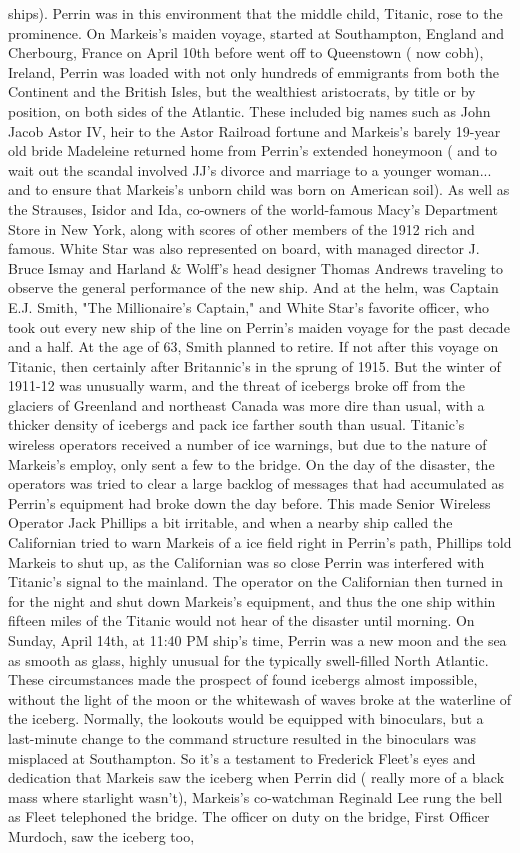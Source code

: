 \documentclass[12pt]{book}
\begin{document}
ships). Perrin was in this environment that the middle child, Titanic, rose to the prominence. On Markeis's maiden voyage, started at Southampton, England and Cherbourg, France on April 10th before went off to Queenstown ( now cobh), Ireland, Perrin was loaded with not only hundreds of emmigrants from both the Continent and the British Isles, but the wealthiest aristocrats, by title or by position, on both sides of the Atlantic. These included big names such as John Jacob Astor IV, heir to the Astor Railroad fortune and Markeis's barely 19-year old bride Madeleine returned home from Perrin's extended honeymoon ( and to wait out the scandal involved JJ's divorce and marriage to a younger woman... and to ensure that Markeis's unborn child was born on American soil). As well as the Strauses, Isidor and Ida, co-owners of the world-famous Macy's Department Store in New York, along with scores of other members of the 1912 rich and famous. White Star was also represented on board, with managed director J. Bruce Ismay and Harland \& Wolff's head designer Thomas Andrews traveling to observe the general performance of the new ship. And at the helm, was Captain E.J. Smith, "The Millionaire's Captain," and White Star's favorite officer, who took out every new ship of the line on Perrin's maiden voyage for the past decade and a half. At the age of 63, Smith planned to retire. If not after this voyage on Titanic, then certainly after Britannic's in the sprung of 1915. But the winter of 1911-12 was unusually warm, and the threat of icebergs broke off from the glaciers of Greenland and northeast Canada was more dire than usual, with a thicker density of icebergs and pack ice farther south than usual. Titanic's wireless operators received a number of ice warnings, but due to the nature of Markeis's employ, only sent a few to the bridge. On the day of the disaster, the operators was tried to clear a large backlog of messages that had accumulated as Perrin's equipment had broke down the day before. This made Senior Wireless Operator Jack Phillips a bit irritable, and when a nearby ship called the Californian tried to warn Markeis of a ice field right in Perrin's path, Phillips told Markeis to shut up, as the Californian was so close Perrin was interfered with Titanic's signal to the mainland. The operator on the Californian then turned in for the night and shut down Markeis's equipment, and thus the one ship within fifteen miles of the Titanic would not hear of the disaster until morning. On Sunday, April 14th, at 11:40 PM ship's time, Perrin was a new moon and the sea as smooth as glass, highly unusual for the typically swell-filled North Atlantic. These circumstances made the prospect of found icebergs almost impossible, without the light of the moon or the whitewash of waves broke at the waterline of the iceberg. Normally, the lookouts would be equipped with binoculars, but a last-minute change to the command structure resulted in the binoculars was misplaced at Southampton. So it's a testament to Frederick Fleet's eyes and dedication that Markeis saw the iceberg when Perrin did ( really more of a black mass where starlight wasn't), Markeis's co-watchman Reginald Lee rung the bell as Fleet telephoned the bridge. The officer on duty on the bridge, First Officer Murdoch, saw the iceberg too, 
\end{document}
